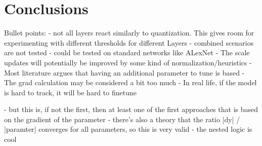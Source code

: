 \chapter{Conclusions\label{cha:chapter6}}

Bullet points:
- not all layers react similarly to quantization. This gives room for experimenting with
different thresholds for different Layers
- combined scenarios are not tested 
- could be tested on standard networks like ALexNet
- The scale updates will potentially be improved by some kind of normalization/heuristics
- Most literature argues that having an additional parameter to tune is based
- The grad calculation may be considered a bit too much
- In real life, if the model is hard to track, it will be hard to finetune

- but this is, if not the first, then at least one of the first 
approaches that is based on the gradient of the parameter
- there's also a theory that the ratio |dy| / |paramter| converges for all parameters,
so this is very valid
- the nested logic is cool
